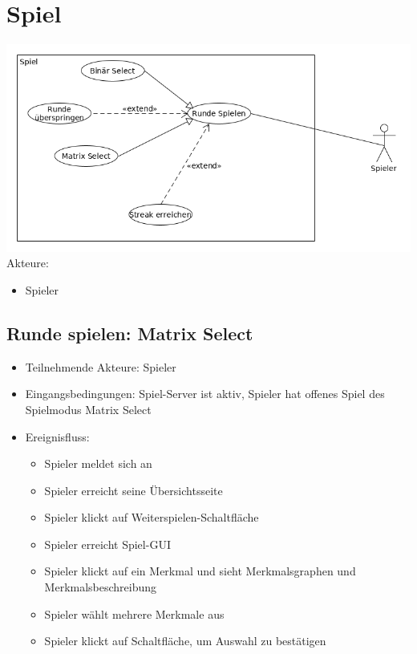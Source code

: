 \documentclass[a4paper]{scrreprt}
\begin{document}
    \newpage
    \section{Spiel}
    \includegraphics[width=\textwidth]{uml/export/Spiel.png}
    Akteure: 
    \begin{itemize}
    \item \Gls{Spieler}
    \newpage
    \end{itemize}
    
   
    \subsection{Runde spielen: Matrix Select}
    \begin{itemize}
    	\item Teilnehmende Akteure: \Gls{Spieler}
    	\item Eingangsbedingungen: Spiel-Server ist aktiv, Spieler hat offenes Spiel des \Gls{Spielmodus} Matrix Select
    	\item Ereignisfluss:
    	\begin{itemize}
    		\item \Gls{Spieler} meldet sich an
    		\item \Gls{Spieler} erreicht seine Übersichtsseite
    		\item \Gls{Spieler} klickt auf Weiterspielen-Schaltfläche
    		\item \Gls{Spieler} erreicht Spiel-GUI
    		\item \Gls{Spieler} klickt auf ein Merkmal und sieht Merkmalsgraphen und Merkmalsbeschreibung
    		\item \Gls{Spieler} wählt mehrere Merkmale aus
    		\item \Gls{Spieler} klickt auf Schaltfläche, um Auswahl zu bestätigen
    	\end{itemize}
    \end{itemize}
	
\end{document}
